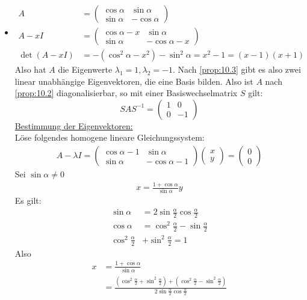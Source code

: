 \documentclass[a4paper, 10pt]{scrbook}
\begin{document}
\begin{ex}
\begin{itemize}
\item
\begin{align*}
A&=\begin{pmatrix}\cos\alpha & \sin \alpha\\\sin \alpha&-\cos\alpha\end{pmatrix}\\
A-xI&=\begin{pmatrix}\cos\alpha-x & \sin \alpha\\\sin \alpha&-\cos\alpha-x\end{pmatrix}\\
\det(A-xI)&=-(\cos^2\alpha - x^2)-\sin^2\alpha=x^2-1=(x-1)(x+1)
\end{align*}
Also hat $A$ die Eigenwerte $\lambda_1=1, \lambda_2=-1$.
Nach \ref{prop:10.3} gibt es also zwei linear unabhängige Eigenvektoren, die eine Basis bilden.
Also ist $A$ nach \ref{prop:10.2} diagonalisierbar, so mit einer Basiswechselmatrix $S$ gilt:
\[
SAS^{-1}=\begin{pmatrix}1&0\\0&-1\end{pmatrix}
\]
\underline{Bestimmung der Eigenvektoren:}\\
Löse folgendes homogene lineare Gleichungssystem:
\begin{align*}
A-\lambda I=\begin{pmatrix}\cos\alpha-1&\sin\alpha \\ \sin\alpha & -\cos\alpha -1\end{pmatrix}
\begin{pmatrix}x\\y\end{pmatrix}=
\begin{pmatrix}0\\0\end{pmatrix}
\end{align*}
Sei $\sin \alpha\neq 0$
\begin{align*}
x=\frac{1+\cos \alpha}{\sin \alpha}y
\end{align*}
Es gilt:
\begin{align*}
\sin\alpha &= 2\sin\frac{\alpha}2\cos\frac{\alpha}2\\
\cos\alpha &= \cos^2\frac\alpha2-\sin\frac\alpha2\\
\cos^2\frac\alpha2&+\sin^2\frac\alpha2=1
\end{align*}
Also
\begin{align*}
x&=\frac{1+\cos\alpha}{\sin\alpha}\\
&=\frac{(\cos^2\frac\alpha2+\sin^2\frac\alpha2)+(\cos^2\frac\alpha2-\sin^2\frac\alpha2)}{2\sin\frac\alpha2\cos\frac\alpha2}\\

\end{align*}
\end{itemize}
\end{ex}
\end{document}
